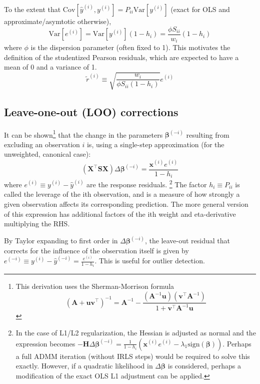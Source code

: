 \documentclass{article}
\newcommand{\bbeta}{\boldsymbol{\beta}}
\begin{document}
To the extent that \(\mathrm{Cov}[\hat{y}^{(i)}, y^{(i)}] = P_{ii}
\mathrm{Var}[y^{(i)}] \) (exact for OLS and approximate/asymtotic otherwise),
\[ \mathrm{Var}[e^{(i)}] = \mathrm{Var}[y^{(i)}] (1 - h_i) = \frac{\phi S_{ii}}{w_i} (1-h_i) \]
where \(\phi\) is the dispersion parameter (often fixed to 1). This motivates
the definition of the studentized Pearson residuals, which are expected to have
a mean of 0 and a variance of 1.
\[ \tilde{r}^{(i)} \equiv \sqrt{\frac{w_i}{\phi S_{ii} (1 - h_i)}} e^{(i)}\]

\subsection{Leave-one-out (LOO) corrections}

It can be shown\footnote{
    This derivation uses the Sherman-Morrison formula
    \[ \left(\mathbf{A} + \mathbf{u}\mathbf{v}^\intercal\right)^{-1} = \mathbf{A}^{-1} - \frac{\left(\mathbf{A}^{-1}\mathbf{u}\right) \left(\mathbf{v}^\intercal \mathbf{A}^{-1} \right)}{1 + \mathbf{v}^\intercal\mathbf{A}^{-1}\mathbf{u}}\]
} that the change in the parameters
\(\bbeta^{(-i)}\) resulting from excluding an observation \(i\)
is, using a single-step approximation (for the unweighted, canonical case):
\[\left(\mathbf{X}^\intercal \mathbf{S} \mathbf{X} \right) \Delta \bbeta^{(-i)} = \frac{\mathbf{x}^{(i)} e^{(i)}}{1 - h_{i}} \]
where \(e^{(i)}\equiv y^{(i)} - \hat{y}^{(i)}\) are the response residuals.
\footnote{
  In the case of L1/L2 regularization, the Hessian is adjusted as normal and
the expression becomes \( -\mathbf{H} \Delta\bbeta^{(-i)} =
\frac{1}{1-h_i}\left(\mathbf{x}^{(i)}e^{(i)} - \lambda_1 \mathrm{sign}(\bbeta)
\right)\). Perhaps a full ADMM iteration (without IRLS steps) would be required
to solve this exactly. However, if a quadratic likelihood in \(\Delta \bbeta\)
is considered, perhaps a modification of the exact OLS L1 adjustment can be
applied.}
The factor \(h_{i} \equiv P_{ii} \) is called the leverage of the
ith observation, and is a measure of how strongly a given observation affects
its corresponding prediction. The more general version of this expression has
additional factors of the ith weight and eta-derivative multiplying the RHS.

By Taylor expanding to first order in \(\Delta \bbeta^{(-i)}\), the leave-out residual that corrects for the influence of the observation itself is given by \(e^{(-i)} \equiv y^{(i)} - \hat{y}^{(-i)} = \frac{e^{(i)}}{1 - h_i}\). This is useful for outlier detection.
\end{document}
